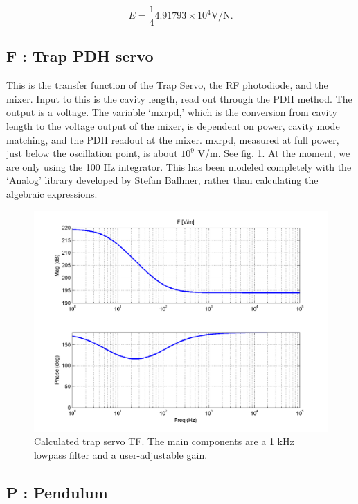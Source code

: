\begin{equation}
E = \frac{1}{4} 4.91793\times 10^{4}\mbox{V/N}.
\label{eq:E}
\end{equation}

\subsection{F : Trap PDH servo}

This is the transfer function of the Trap Servo, the RF photodiode, and the mixer.  Input to this is the cavity length, read out through the PDH method. The output is a voltage. The variable `mxrpd,' which is the conversion from cavity length to the voltage output of the mixer, is dependent on power, cavity mode matching, and the PDH readout at the mixer. mxrpd, measured at full power, just below the oscillation point, is about $10^9$ V/m. See fig. \ref{fig:F}.  At the moment, we are only using the 100 Hz integrator. This has been modeled completely with the `Analog' library developed by Stefan Ballmer, rather than calculating the algebraic expressions. 



\begin{figure}[htb]
\includegraphics[width=\columnwidth]{figures/controls/F.png}%
\caption[Calculated trap servo TF]{Calculated trap servo TF. The main components are a 1 kHz lowpass filter and a user-adjustable gain.}%
\label{fig:F}%
\end{figure}

\subsection{P : Pendulum}


